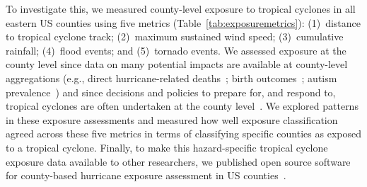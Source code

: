 To investigate this, we measured county-level exposure to tropical cyclones in
all eastern \ac{US} counties using five metrics
(Table~\ref{tab:exposuremetrics}): (1)~distance to tropical cyclone track;
(2)~maximum sustained wind speed; (3)~cumulative rainfall; (4)~flood events;
and (5)~tornado events.  We assessed exposure at the county level since data on
many potential impacts are available at county-level aggregations (e.g., direct
hurricane-related deaths~\parencite{czajkowski2011}; birth
outcomes~\parencite{grabich2015, grabich2016}; autism
prevalence~\parencite{kinney2008}) and since decisions and policies to prepare for,
and respond to, tropical cyclones are often undertaken at the county
level~\parencite{zandbergen2009, rappaport2000}.  We explored patterns in these
exposure assessments and measured how well exposure classification agreed
across these five metrics in terms of classifying specific counties as exposed
to a tropical cyclone.  Finally, to make this hazard-specific tropical cyclone
exposure data available to other researchers, we published open source software
for county-based hurricane exposure assessment in \ac{US}
counties~\parencite{hurricaneexposure}.
